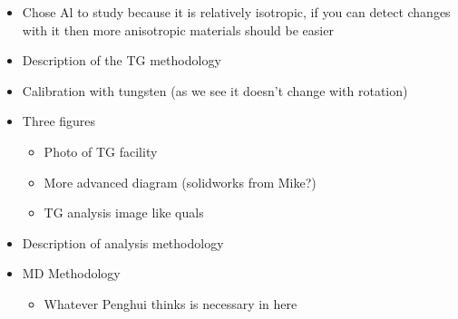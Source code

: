 
\begin{itemize}
\item Chose Al to study because it is relatively isotropic, if you can detect changes with it then more anisotropic materials should be easier
\item Description of the TG methodology
\item Calibration with tungsten (as we see it doesn't change with rotation)
\item Three figures
\begin{itemize}
\item Photo of TG facility
\item More advanced diagram (solidworks from Mike?)
\item TG analysis image like quals
\end{itemize}
\item Description of analysis methodology
\item MD Methodology
\begin{itemize}
\item Whatever Penghui thinks is necessary in here
\end{itemize}
\end{itemize}